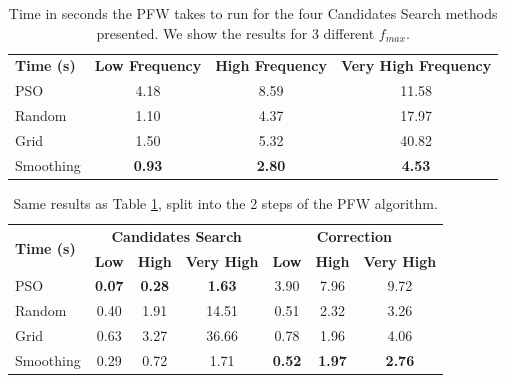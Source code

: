 \documentclass[a4paper,12pt,oneside]{report}
\theoremstyle{named}
\begin{document}
\begin{table}
  \centering
  \renewcommand{\arraystretch}{1.2}
  \begin{tabular}{|p{2cm}|ccc|}
    \hline
    \multirow{2}{3cm}{\textbf{Time (s)}} & \multirow{2}{2.5cm}{\textbf{Low Frequency}} & \multirow{2}{3cm}{\textbf{High Frequency}} & \multirow{2}{3cm}{\textbf{Very High Frequency}}\\
     &  &  &   \\
    \hline
    PSO & 4.18 & 8.59 & 11.58   \\ \hline
    Random & 1.10 & 4.37 & 17.97\\ \hline
    Grid & 1.50 & 5.32 & 40.82  \\ \hline
    Smoothing  & \textbf{0.93} & \textbf{2.80} & \textbf{4.53} \\ \hline
  \end{tabular}
  \caption{Time in seconds the PFW takes to run for the four Candidates Search methods presented. We show the results for 3 different $f_{max}$.}
  \label{table:cs}
\end{table}

\begin{table}
  \centering
  \renewcommand{\arraystretch}{1.2}
  \begin{tabular}{|p{2cm}|ccc|ccc|}
    \hline
    \multirow{2}{3cm}{\textbf{Time (s)}} & \multicolumn{3}{c|}{\textbf{Candidates Search}} & \multicolumn{3}{c|}{\textbf{Correction}}\\

    \cline{2-7}
    & \textbf{Low} & \textbf{High} & \textbf{Very High} & \textbf{Low} & \textbf{High} & \textbf{Very High} \\
    \hline
    PSO & \textbf{0.07} & \textbf{0.28} & \textbf{1.63} & 3.90 & 7.96 & 9.72 \\ \hline
    Random & 0.40 & 1.91 & 14.51 & 0.51  & 2.32 & 3.26 \\ \hline
    Grid & 0.63 & 3.27 & 36.66 & 0.78 & 1.96 & 4.06 \\ \hline
    Smoothing & 0.29 & 0.72 & 1.71 & \textbf{0.52} & \textbf{1.97} &  \textbf{2.76} \\ \hline
  \end{tabular}
  \caption{Same results as Table \ref{table:cs}, split into the 2 steps of the PFW algorithm.}
  \label{table:cs2}
\end{table}
\end{document}
